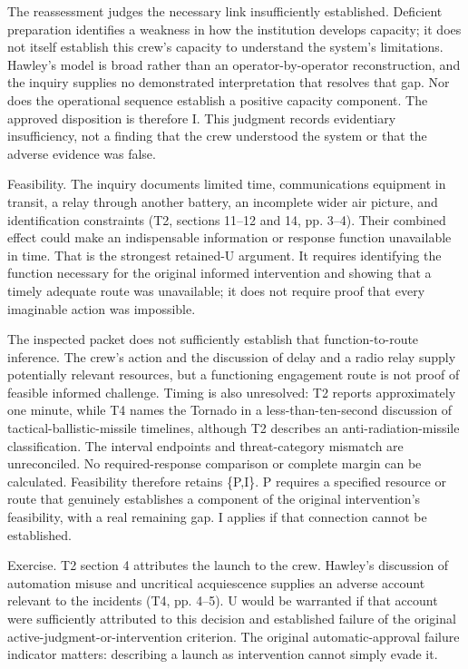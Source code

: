\documentclass[11pt]{article}
\begin{document}
The reassessment judges the necessary link insufficiently established. Deficient preparation identifies a weakness in how the institution develops capacity; it does not itself establish this crew's capacity to understand the system's limitations. Hawley's model is broad rather than an operator-by-operator reconstruction, and the inquiry supplies no demonstrated interpretation that resolves that gap. Nor does the operational sequence establish a positive capacity component. The approved disposition is therefore I. This judgment records evidentiary insufficiency, not a finding that the crew understood the system or that the adverse evidence was false.

Feasibility. The inquiry documents limited time, communications equipment in transit, a relay through another battery, an incomplete wider air picture, and identification constraints (T2, sections 11--12 and 14, pp. 3--4). Their combined effect could make an indispensable information or response function unavailable in time. That is the strongest retained-U argument. It requires identifying the function necessary for the original informed intervention and showing that a timely adequate route was unavailable; it does not require proof that every imaginable action was impossible.

The inspected packet does not sufficiently establish that function-to-route inference. The crew's action and the discussion of delay and a radio relay supply potentially relevant resources, but a functioning engagement route is not proof of feasible informed challenge. Timing is also unresolved: T2 reports approximately one minute, while T4 names the Tornado in a less-than-ten-second discussion of tactical-ballistic-missile timelines, although T2 describes an anti-radiation-missile classification. The interval endpoints and threat-category mismatch are unreconciled. No required-response comparison or complete margin can be calculated. Feasibility therefore retains \{P,I\}. P requires a specified resource or route that genuinely establishes a component of the original intervention's feasibility, with a real remaining gap. I applies if that connection cannot be established.

Exercise. T2 section 4 attributes the launch to the crew. Hawley's discussion of automation misuse and uncritical acquiescence supplies an adverse account relevant to the incidents (T4, pp. 4--5). U would be warranted if that account were sufficiently attributed to this decision and established failure of the original active-judgment-or-intervention criterion. The original automatic-approval failure indicator matters: describing a launch as intervention cannot simply evade it.
\end{document}
